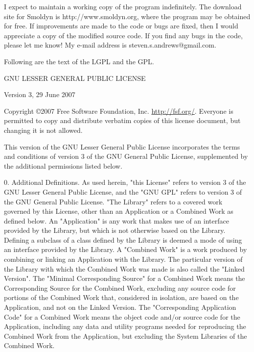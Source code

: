 \documentclass {book}
\begin{document}
I expect to maintain a working copy of the program indefinitely. The download site for Smoldyn is http://www.smoldyn.org, where the program may be obtained for free. If improvements are made to the code or bugs are fixed, then I would appreciate a copy of the modified source code. If you find any bugs in the code, please let me know! My e-mail address is steven.s.andrews@gmail.com.

Following are the text of the LGPL and the GPL.

\begin{tiny}
\begin{center}
GNU LESSER GENERAL PUBLIC LICENSE

Version 3, 29 June 2007
\end{center}

Copyright \copyright 2007 Free Software Foundation, Inc. \url{http://fsf.org/}. Everyone is permitted to copy and distribute verbatim copies of this license document, but changing it is not allowed.

This version of the GNU Lesser General Public License incorporates the terms and conditions of version 3 of the GNU General Public License, supplemented by the additional permissions listed below.

0. Additional Definitions. As used herein, "this License" refers to version 3 of the GNU Lesser General Public License, and the "GNU GPL" refers to version 3 of the GNU General Public License. "The Library" refers to a covered work governed by this License, other than an Application or a Combined Work as defined below. An "Application" is any work that makes use of an interface provided by the Library, but which is not otherwise based on the Library. Defining a subclass of a class defined by the Library is deemed a mode of using an interface provided by the Library. A "Combined Work" is a work produced by combining or linking an Application with the Library. The particular version of the Library with which the Combined Work was made is also called the "Linked Version". The "Minimal Corresponding Source" for a Combined Work means the Corresponding Source for the Combined Work, excluding any source code for portions of the Combined Work that, considered in isolation, are based on the Application, and not on the Linked Version. The "Corresponding Application Code" for a Combined Work means the object code and/or source code for the Application, including any data and utility programs needed for reproducing the Combined Work from the Application, but excluding the System Libraries of the Combined Work.


\end{tiny}
\end{document}
